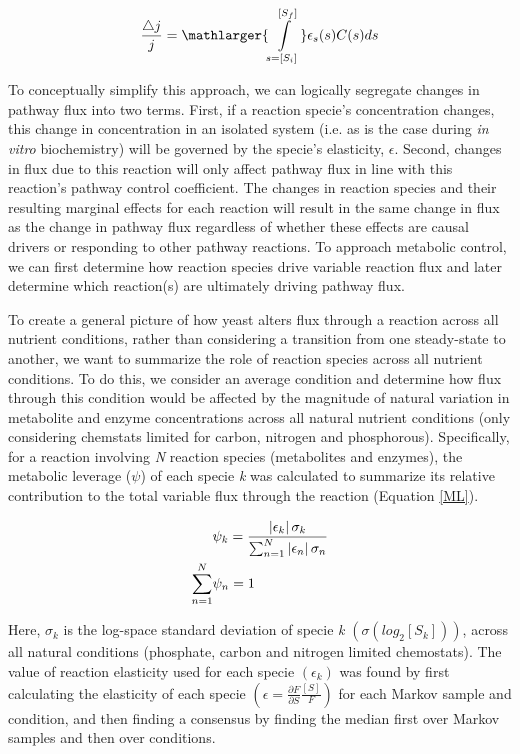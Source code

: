 \begin{equation}
\frac{\bigtriangleup j}{j} = \mathlarger{\int\limits_{s = \left[S_{i}\right]}^{\left[S_{f}\right]}}\epsilon_{s}(s)C(s)ds
\label{KBequation}
\end{equation}

To conceptually simplify this approach, we can logically segregate changes in pathway flux into two terms. First, if a reaction specie's concentration changes, this change in concentration in an isolated system (i.e. as is the case during \textit{in vitro} biochemistry) will be governed by the specie's elasticity, $\epsilon$. Second, changes in flux due to this reaction will only affect pathway flux in line with this reaction's pathway control coefficient.  The changes in reaction species and their resulting marginal effects for each reaction will result in the same change in flux as the change in pathway flux regardless of whether these effects are causal drivers or responding to other pathway reactions. To approach metabolic control, we can first determine how reaction species drive variable reaction flux and later determine which reaction(s) are ultimately driving pathway flux.

To create a general picture of how yeast alters flux through a reaction across all nutrient conditions, rather than considering a transition from one steady-state to another, we want to summarize the role of reaction species across all nutrient conditions.  To do this, we consider an average condition and determine how flux through this condition would be affected by the magnitude of natural variation in metabolite and enzyme concentrations across all natural nutrient conditions (only considering chemstats limited for carbon, nitrogen and phosphorous).  Specifically, for a reaction involving \textit{N} reaction species (metabolites and enzymes), the metabolic leverage ($\psi$) of each specie \textit{k} was calculated to summarize its relative contribution to the total variable flux through the reaction (Equation \ref{ML}).  

\begin{align}
&\psi_{k} = \frac{\left|\epsilon_{k}\right|\sigma_{k}}{\sum_{n = 1}^{N}\left|\epsilon_{n}\right|\sigma_{n}}\label{ML}\\
\sum_{n = 1}^{N} &\psi_{n} = 1\notag
\end{align}

Here, $\sigma_{k}$ is the log-space standard deviation of specie \textit{k} $\left(\sigma\left(log_{2}\left[S_{k}\right]\right)\right)$, across all natural conditions (phosphate, carbon and nitrogen limited chemostats).  The value of reaction elasticity used for each specie $\left(\epsilon_{k}\right)$ was found by first calculating the elasticity of each specie $\left(\epsilon = \frac{\partial F}{\partial S}\frac{[S]}{F}\right)$ for each Markov sample and condition, and then finding a consensus by finding the median first over Markov samples and then over conditions. 

